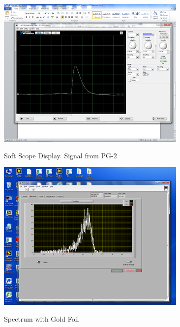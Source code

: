 \documentclass{../lab}
\begin{document}
\begin{figure}[h]
\begin{minipage}{0.49\linewidth}
    \href{http://experimentationlab.berkeley.edu/sites/default/files/images/350px-RUT_Soft_Scope.png}{\includegraphics[width=\linewidth]{images/350px-RUT_Soft_Scope.png}}
    \caption{Soft Scope Display. Signal from PG-2}
    \label{fig:SoftScopeDisplay}
    \end{minipage} \hfill
    \begin{minipage}{0.49\linewidth}
        \href{http://experimentationlab.berkeley.edu/sites/default/files/images/350px-RUT_Spectrum_with_Foil.png}{\includegraphics[width=\linewidth]{images/350px-RUT_Spectrum_with_Foil.png}}
    \caption{Spectrum with Gold Foil}
    \label{fig:350px-RUT_Spectrum_with_Foil}
    \end{minipage}
\end{figure}
\end{document}
